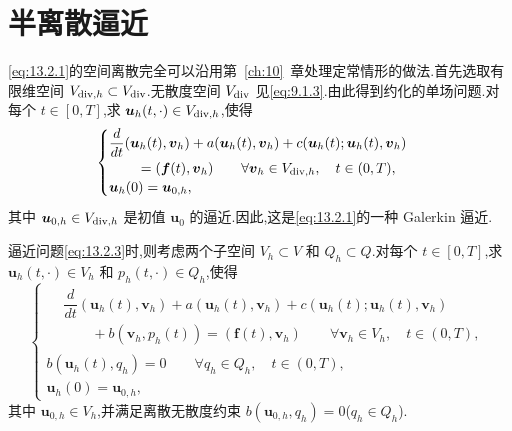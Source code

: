 \section{半离散逼近}\label{sec:13.3}

\eqref{eq:13.2.1}的空间离散完全可以沿用第~\ref{ch:10}~章处理定常情形的做法.首先选取有限维空间 \(V_{{\rm div},h}\subset V_{\rm div}\).无散度空间 \(V_{\rm div}\) 见\eqref{eq:9.1.3}.由此得到约化的单场问题.对每个 \(t\in[0,T]\),求 \(\boldsymbol{u}_h(t,\cdot)\in V_{{\rm div},h}\),使得
\begin{equation}\label{eq:13.3.1}
  \begin{cases}
    \begin{aligned}
      &\dfrac{d}{dt}(\boldsymbol{u}_h(t),\boldsymbol{v}_h)+a(\boldsymbol{u}_h(t),\boldsymbol{v}_h)
         +c(\boldsymbol{u}_h(t);\boldsymbol{u}_h(t),\boldsymbol{v}_h)\\
      &\qquad=(\boldsymbol{f}(t),\boldsymbol{v}_h)
           \qquad\forall\boldsymbol{v}_h\in V_{{\rm div},h},\quad t\in(0,T),
    \end{aligned}\\[2pt]
    \boldsymbol{u}_h(0)=\boldsymbol{u}_{0,h},
  \end{cases}
\end{equation}
其中 \(\boldsymbol{u}_{0,h}\in V_{{\rm div},h}\) 是初值 \(\boldsymbol{u}_0\) 的逼近.因此,这是\eqref{eq:13.2.1}的一种 Galerkin 逼近.

逼近问题\eqref{eq:13.2.3}时,则考虑两个子空间 \(V_h\subset V\) 和 \(Q_h\subset Q\).对每个 \(t\in[0,T]\),求 \(\boldsymbol{u}_h(t,\cdot)\in V_h\) 和 \(p_h(t,\cdot)\in Q_h\),使得
\begin{equation}\label{eq:13.3.2}
  \begin{cases}
    \begin{aligned}
      &\dfrac{d}{dt}(\boldsymbol{u}_h(t),\boldsymbol{v}_h)+a(\boldsymbol{u}_h(t),\boldsymbol{v}_h)
         +c(\boldsymbol{u}_h(t);\boldsymbol{u}_h(t),\boldsymbol{v}_h)\\
      &\qquad+b(\boldsymbol{v}_h,p_h(t))=(\boldsymbol{f}(t),\boldsymbol{v}_h)
         \qquad\forall\boldsymbol{v}_h\in V_h,\quad t\in(0,T),
    \end{aligned}\\[2pt]
    b(\boldsymbol{u}_h(t),q_h)=0\qquad\forall q_h\in Q_h,\quad t\in(0,T),\\
    \boldsymbol{u}_h(0)=\boldsymbol{u}_{0,h},
  \end{cases}
\end{equation}
其中 \(\boldsymbol{u}_{0,h}\in V_h\),并满足离散无散度约束 \(b(\boldsymbol{u}_{0,h},q_h)=0\)(\(q_h\in Q_h\)).

